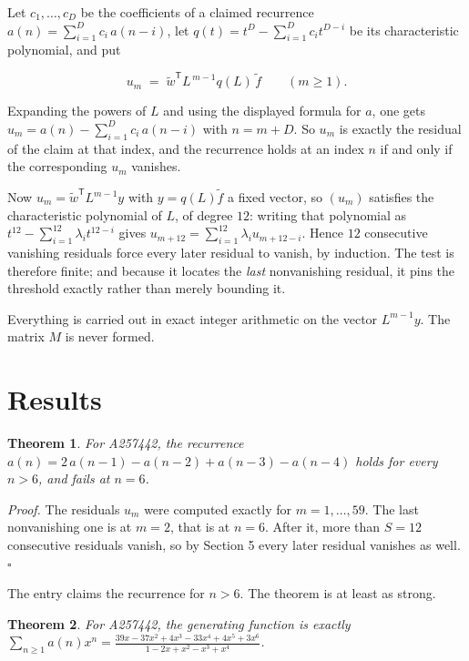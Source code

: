 \documentclass[11pt]{article}
\newtheorem{theorem}{Theorem}
\theoremstyle{definition}
\begin{document}
Let $c_1,\dots,c_D$ be the coefficients of a claimed recurrence $a(n) = \sum_{i=1}^{D} c_i\,a(n-i)$, let $q(t) = t^{D} - \sum_{i=1}^{D} c_i t^{D-i}$ be its characteristic polynomial, and put

\[u_m \;=\; \tilde w^{\mathsf T} L^{\,m-1} q(L)\,\tilde f \qquad (m \ge 1).\]

Expanding the powers of $L$ and using the displayed formula for $a$, one gets $u_m = a(n) - \sum_{i=1}^{D} c_i\,a(n-i)$ with $n = m + D$. So $u_m$ is exactly the residual of the claim at that index, and the recurrence holds at an index $n$ if and only if the corresponding $u_m$ vanishes.

Now $u_m = \tilde w^{\mathsf T} L^{m-1} y$ with $y = q(L)\tilde f$ a fixed vector, so $(u_m)$ satisfies the characteristic polynomial of $L$, of degree $12$: writing that polynomial as $t^{12} - \sum_{i=1}^{12} \lambda_i t^{12-i}$ gives $u_{m+12} = \sum_{i=1}^{12} \lambda_i u_{m+12-i}$. Hence $12$ consecutive vanishing residuals force every later residual to vanish, by induction. The test is therefore finite; and because it locates the {\itshape last} nonvanishing residual, it pins the threshold exactly rather than merely bounding it.

Everything is carried out in exact integer arithmetic on the vector $L^{m-1}y$. The matrix $M$ is never formed.

\section{Results}

\begin{theorem} For A257442, the recurrence $a(n) = 2\,a(n-1) - a(n-2) + a(n-3) - a(n-4)$ holds for every $n > 6$, and fails at $n = 6$.\end{theorem}

{\itshape Proof.} The residuals $u_m$ were computed exactly for $m = 1,\dots,59$. The last nonvanishing one is at $m = 2$, that is at $n = 6$. After it, more than $S = 12$ consecutive residuals vanish, so by Section 5 every later residual vanishes as well. $\square$

The entry claims the recurrence for $n > 6$. The theorem is at least as strong.

\begin{theorem} For A257442, the generating function is exactly $\sum_{n\ge 1} a(n)x^n = \frac{39x - 37x^{2} + 4x^{3} - 33x^{4} + 4x^{5} + 3x^{6}}{1 - 2x + x^{2} - x^{3} + x^{4}}$.\end{theorem}
\end{document}
